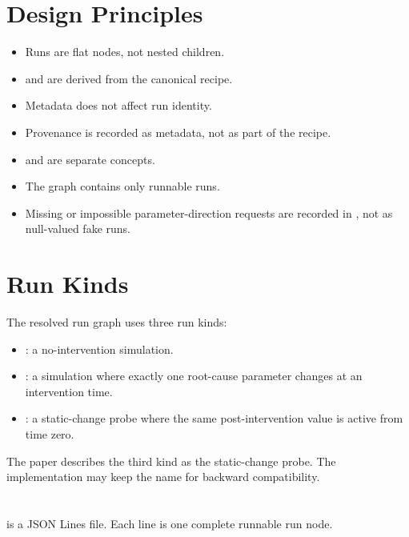 \documentclass[11pt]{article}
\begin{document}
\section*{Design Principles}

\begin{itemize}
\item Runs are flat nodes, not nested children.
\item {} and  are derived from the canonical recipe.
\item Metadata does not affect run identity.
\item Provenance is recorded as metadata, not as part of the recipe.
\item {} and  are separate concepts.
\item The graph contains only runnable runs.
\item Missing or impossible parameter-direction requests are recorded in , not as null-valued fake runs.
\end{itemize}

\section*{Run Kinds}

The resolved run graph uses three run kinds:

\begin{itemize}
\item {}: a no-intervention simulation.
\item {}: a simulation where exactly one root-cause parameter changes at an intervention time.
\item {}: a static-change probe where the same post-intervention value is active from time zero.
\end{itemize}

The paper describes the third kind as the static-change probe.
The implementation may keep the name  for backward compatibility.

\section*{\texorpdfstring{}{run_nodes.jsonl}}

 is a JSON Lines file.
Each line is one complete runnable run node.
\end{document}
